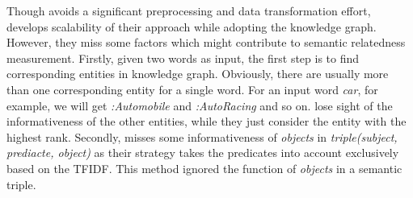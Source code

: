 Though \cite{aaai/Pirro12} avoids a significant preprocessing and data
transformation effort, develops scalability of their approach while adopting 
the knowledge graph. However, they miss some factors which
might contribute to semantic relatedness measurement. Firstly, given two words
as input, the first step is to find corresponding entities in knowledge
graph. Obviously, there are usually more than one corresponding entity for a single word.
For an input word \emph{car}, for example, we will get \emph{:Automobile} and
\emph{:Auto\underline{\hspace{0.5em}}Racing} and so on. \cite{aaai/Pirro12} lose
sight of the informativeness of the other entities, while they just
consider the entity with the highest rank. Secondly, \cite{aaai/Pirro12} misses
some informativeness of \emph{objects} in \emph{triple(subject, prediacte, object)} as their strategy takes
the predicates into account exclusively based on the TFIDF. This
method ignored the function of \emph{objects} in a semantic triple.

